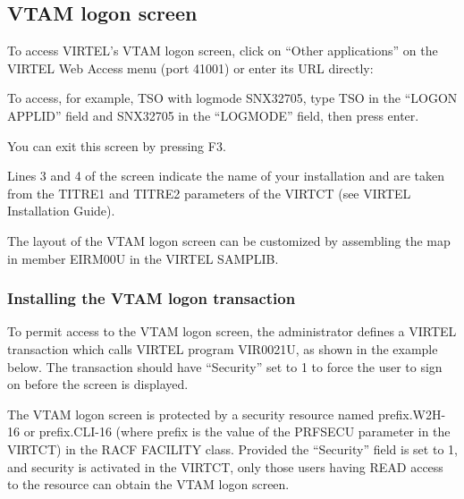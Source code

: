 \documentclass[letterpaper,10pt,english]{sphinxmanual}
\begin{document}
\subsection{VTAM logon screen}
\label{\detokenize{User_Guide:vtam-logon-screen}}
To access VIRTEL’s VTAM logon screen, click on “Other applications” on the VIRTEL Web Access menu (port 41001) or
enter its URL directly:

\begin{sphinxVerbatim}[commandchars=\\\{\}]
\end{sphinxVerbatim}


To access, for example, TSO with logmode SNX32705, type TSO in the “LOGON APPLID” field and SNX32705 in the
“LOGMODE” field, then press enter.

You can exit this screen by pressing F3.

Lines 3 and 4 of the screen indicate the name of your installation and are taken from the TITRE1 and TITRE2
parameters of the VIRTCT (see VIRTEL Installation Guide).

The layout of the VTAM logon screen can be customized by assembling the map in member EIRM00U in the VIRTEL
SAMPLIB.


\subsubsection{Installing the VTAM logon transaction}
\label{\detokenize{User_Guide:installing-the-vtam-logon-transaction}}
To permit access to the VTAM logon screen, the administrator defines a VIRTEL transaction which calls VIRTEL program
VIR0021U, as shown in the example below. The transaction should have “Security” set to 1 to force the user to sign on
before the screen is displayed.

The VTAM logon screen is protected by a security resource named prefix.W2H-16 or prefix.CLI-16 (where prefix is the
value of the PRFSECU parameter in the VIRTCT) in the RACF FACILITY class. Provided the “Security” field is set to 1, and
security is activated in the VIRTCT, only those users having READ access to the resource can obtain the VTAM logon
screen.
\end{document}
